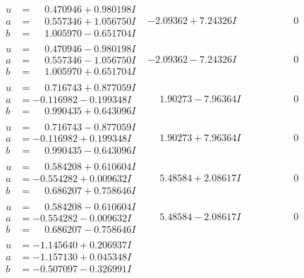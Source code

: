 \documentclass[1p]{elsarticle_modified}
\theoremstyle{definition}
\begin{document}
$$\begin{array}{c|c|c}
\begin{aligned}
u &= \phantom{-}0.470946 + 0.980198 I \\
a &= \phantom{-}0.557346 + 1.056750 I \\
b &= \phantom{-}1.005970 - 0.651704 I\end{aligned}
 & -2.09362 + 7.24326 I & \phantom{-0.000000 } 0 \\ \hline\begin{aligned}
u &= \phantom{-}0.470946 - 0.980198 I \\
a &= \phantom{-}0.557346 - 1.056750 I \\
b &= \phantom{-}1.005970 + 0.651704 I\end{aligned}
 & -2.09362 - 7.24326 I & \phantom{-0.000000 } 0 \\ \hline\begin{aligned}
u &= \phantom{-}0.716743 + 0.877059 I \\
a &= -0.116982 - 0.199348 I \\
b &= \phantom{-}0.990435 + 0.643096 I\end{aligned}
 & \phantom{-}1.90273 - 7.96364 I & \phantom{-0.000000 } 0 \\ \hline\begin{aligned}
u &= \phantom{-}0.716743 - 0.877059 I \\
a &= -0.116982 + 0.199348 I \\
b &= \phantom{-}0.990435 - 0.643096 I\end{aligned}
 & \phantom{-}1.90273 + 7.96364 I & \phantom{-0.000000 } 0 \\ \hline\begin{aligned}
u &= \phantom{-}0.584208 + 0.610604 I \\
a &= -0.554282 + 0.009632 I \\
b &= \phantom{-}0.686207 + 0.758646 I\end{aligned}
 & \phantom{-}5.48584 + 2.08617 I & \phantom{-0.000000 } 0 \\ \hline\begin{aligned}
u &= \phantom{-}0.584208 - 0.610604 I \\
a &= -0.554282 - 0.009632 I \\
b &= \phantom{-}0.686207 - 0.758646 I\end{aligned}
 & \phantom{-}5.48584 - 2.08617 I & \phantom{-0.000000 } 0 \\ \hline\begin{aligned}
u &= -1.145640 + 0.206937 I \\
a &= -1.157130 + 0.045348 I \\
b &= -0.507097 - 0.326991 I\end{aligned}

\end{array}$$
\end{document}
